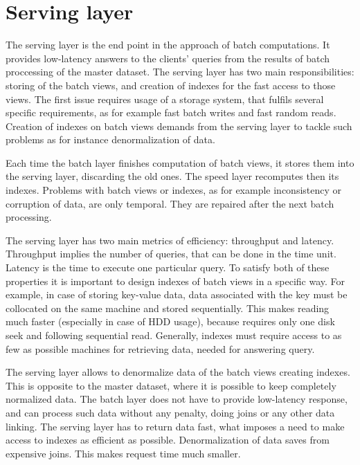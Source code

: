 \section{Serving layer}

The serving layer is the end point in the approach of batch computations.
It provides low-latency answers to the clients' queries from the results of batch proccessing of the master dataset.
The serving layer has two main responsibilities: storing of the batch views, and creation of indexes for the fast access to those views.
The first issue requires usage of a storage system, that fulfils several specific requirements, as for example fast batch writes and fast random reads. 
Creation of indexes on batch views demands from the serving layer to tackle such problems as for instance denormalization of data.

Each time the batch layer finishes computation of batch views, it stores them into the serving layer, discarding the old ones.
The speed layer recomputes then its indexes.
Problems with batch views or indexes, as for example inconsistency or corruption of data, are only temporal.
They are repaired after the next batch processing.

The serving layer has two main metrics of efficiency: throughput and latency.
Throughput implies the number of queries, that can be done in the time unit.
Latency is the time to execute one particular query.
To satisfy both of these properties it is important to design indexes of batch views in a specific way.
For example, in case of storing key-value data, data associated with the key must be collocated on the same machine and stored sequentially.
This makes reading much faster (especially in case of HDD usage), because requires only one disk seek and following sequential read.
Generally, indexes must require access to as few as possible machines for retrieving data, needed for answering query.

The serving layer allows to denormalize data of the batch views creating indexes.
This is opposite to the master dataset, where it is possible to keep completely normalized data.
The batch layer does not have to provide low-latency response, and can process such data without any penalty, doing joins or any other data linking.
The serving layer has to return data fast, what imposes a need to make access to indexes as efficient as possible.
Denormalization of data saves from expensive joins.
This makes request time much smaller.

